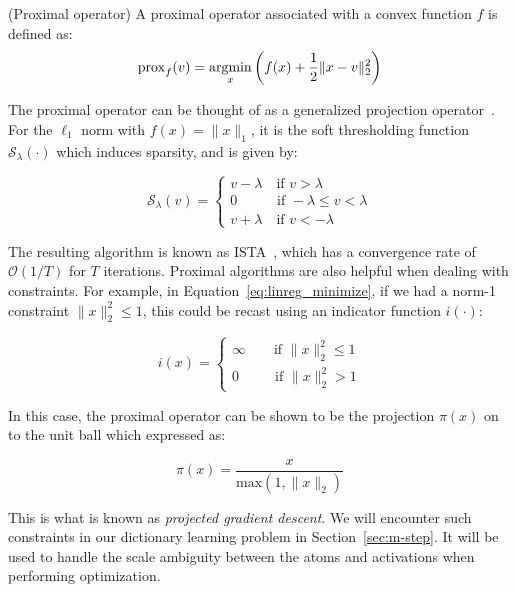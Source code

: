 \vspace{\parskip}
\begin{definition}{(Proximal operator)}
A proximal operator associated with a convex function $f$ is defined as:
\begin{equation}
\mathrm{prox}_f(v) = \mathop{\mathrm{argmin}}_x \bigg( f(x) + \frac{1}{2}\|x - v\|_2^2 \bigg)
\end{equation}
\end{definition}

The proximal operator can be thought of as a generalized projection operator~\citep{parikh2014proximal}. For the $\ell_1$ norm with $f(x)=\|x\|_1$, it is the soft thresholding function $\mathcal{S}_\lambda(\cdot)$ which induces sparsity, and is given by:

\begin{equation}
\mathcal{S}_{\lambda}(v) = \begin{cases}
v - \lambda \quad \text{if }  v > \lambda \\
0 \quad \hspace{22pt} \text{if } -\lambda \leq v < \lambda\\
v + \lambda \quad \text{if } v < -\lambda
\end{cases}
\end{equation}

The resulting algorithm is known as \ac{ISTA}~\citep{daubechies2004iterative, bach2012optimization}, which has a convergence rate of $\mathcal{O}(1/T)$ for $T$ iterations. Proximal algorithms are also helpful when dealing with constraints. For example, in Equation~\ref{eq:linreg_minimize}, if we had a norm-1 constraint $\|x\|_2^2 \leq 1$, this could be recast using an indicator function $i(\cdot)$:

\begin{equation}
i(x) = \begin{cases}
\infty \qquad \text{if } \|x\|_2^2 \leq 1 \\
0 \qquad \hspace{7pt}\text{if } \|x\|_2^2 > 1
\end{cases}
\end{equation}

In this case, the proximal operator can be shown to be the projection $\pi(x)$ on to the unit ball which expressed as:

\begin{equation}
\pi(x) = \frac{x}{\mathrm{max}(1, \|x\|_2)}
\end{equation} 

This is what is known as \textit{projected gradient descent}. We will encounter such constraints in our dictionary learning problem in Section~\ref{sec:m-step}. It will be used to handle the scale ambiguity between the atoms and activations when performing optimization.

